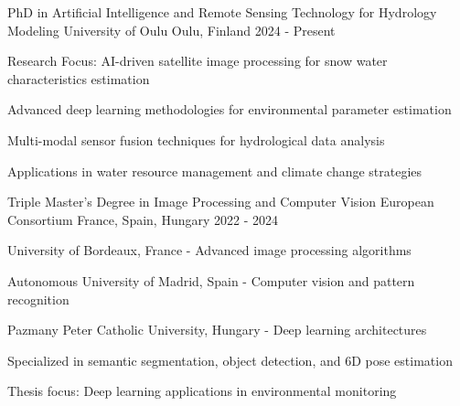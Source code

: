 
\begin{cventries}

  \cventry
    {PhD in Artificial Intelligence and Remote Sensing Technology for Hydrology Modeling} %
    {University of Oulu} %
    {Oulu, Finland} %
    {2024 - Present} %
    {
      \begin{cvitems} %
        \item {Research Focus: AI-driven satellite image processing for snow water characteristics estimation}
        \item {Advanced deep learning methodologies for environmental parameter estimation}
        \item {Multi-modal sensor fusion techniques for hydrological data analysis}
        \item {Applications in water resource management and climate change strategies}
      \end{cvitems}
    }

  \cventry
    {Triple Master's Degree in Image Processing and Computer Vision} %
    {European Consortium} %
    {France, Spain, Hungary} %
    {2022 - 2024} %
    {
      \begin{cvitems} %
        \item {University of Bordeaux, France - Advanced image processing algorithms}
        \item {Autonomous University of Madrid, Spain - Computer vision and pattern recognition}
        \item {Pazmany Peter Catholic University, Hungary - Deep learning architectures}
        \item {Specialized in semantic segmentation, object detection, and 6D pose estimation}
        \item {Thesis focus: Deep learning applications in environmental monitoring}
      \end{cvitems}
    }


\end{cventries}
